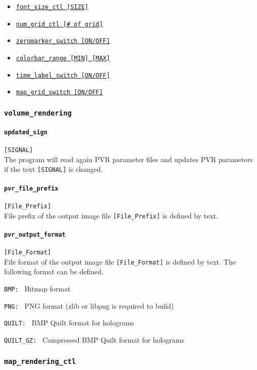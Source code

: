\begin{itemize}
\begin{itemize}
					{\tt colorbar\_scale\_ctl    [ON/OFF]}
			\item \hyperref[href_t:font_size_ctl]
					{\tt font\_size\_ctl    [SIZE]}
			\item \hyperref[href_t:num_grid_ctl]
					{\tt num\_grid\_ctl    [\# of grid]}
			\item \hyperref[href_t:zeromarker_switch]
					{\tt zeromarker\_switch    [ON/OFF]}
			\item \hyperref[href_t:colorbar_range]
					{\tt colorbar\_range    [MIN]  [MAX]}
			\item \hyperref[href_t:time_label_switch]
					{\tt time\_label\_switch    [ON/OFF]}
			\item \hyperref[href_t:map_grid_switch]
					{\tt map\_grid\_switch    [ON/OFF]}
		\end{itemize}
\end{itemize}



\subsubsection{\tt volume\_rendering}
\label{href_t:volume_rendering}
%
\paragraph{\tt updated\_sign}
\label{href_t:updated_sign}  
\verb|[SIGNAL]| \\
The program will read again PVR parameter files and updates PVR parameters if the text \verb|[SIGNAL]| is changed. 
%
\paragraph{\tt pvr\_file\_prefix}
\label{href_t:pvr_file_prefix}  
\verb|[File_Prefix]| \\
File prefix of the output image file  \verb|[File_Prefix]| is defined by text. 
%
\paragraph{\tt pvr\_output\_format}
\label{href_t:pvr_output_format}  
\verb|[File_Format]| \\
File format of the output image file  \verb|[File_Format]| is defined by text.  The following format can be defined.
\begin{description}
\item{\tt BMP: }               Bitmap format
\item{\tt PNG: }               PNG format  (zlib or libpng is required to build)
\item{\tt QUILT: }             BMP Quilt format for holograms
\item{\tt QUILT\_GZ: }      Compressed BMP Quilt format for holograms
\end{description}
%

%
\subsubsection{\tt map\_rendering\_ctl}
\label{href_t:map_rendering_ctl}
%


